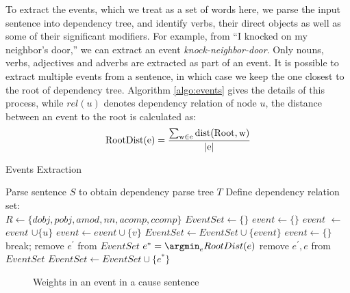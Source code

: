 To extract the events, which we treat as a set of words here,
we parse the input sentence into dependency tree,
and identify verbs, their direct objects as well as some of
their significant modifiers.
For example, from ``I knocked on my neighbor's door,'' we can extract an event
{\em knock-neighbor-door}.
Only nouns, verbs, adjectives and adverbs are extracted
as part of an event. It is possible to extract multiple events from a sentence,
in which case we keep the one closest to the root of dependency tree.
Algorithm \ref{algo:events} gives the details of this process, while $rel(u)$
denotes dependency relation of node $u$, the distance between an event to the
root is calculated as:
\begin{equation}
\rm{RootDist}(e) = \frac{\sum_{w \in e} \rm{dist}(Root, w)}{|e|}
\end{equation}

\begin{algorithm}[th]
\caption{Events Extraction}
\label{algo:events}
\begin{algorithmic}[1]
\begin{small}
\State Parse sentence $S$ to obtain dependency parse tree $T$
\State Define dependency relation set: \\
\quad \quad $R \leftarrow \{dobj, pobj, amod, nn, acomp, ccomp\}$ 
\State $EventSet \leftarrow \{\}$
\State $event \leftarrow \{\}$
\State $event$ $\leftarrow$ $event$ $\cup \{u\}$
\State $event \leftarrow event \cup \{v\}$
\State $EventSet \leftarrow EventSet \cup \{event\}$
\State $event \leftarrow \{\}$
\State break;
\EndIf
\EndWhile
\EndFor
{}
\State remove $e^{'}$ from $EventSet$
\EndIf
{}
\State $e^{*} = \argmin_{e} RootDist(e)$
\State remove $e^{'}, e$ from $EventSet$
\State $EventSet \leftarrow EventSet \cup \{e^{*}\}$
\EndIf
\EndFor
\end{small}
\end{algorithmic}
\end{algorithm}

\begin{figure}[th]
\centering
{}
\caption{Weights in an event in a cause sentence}
\label{fig:causeEvent}
\end{figure}

